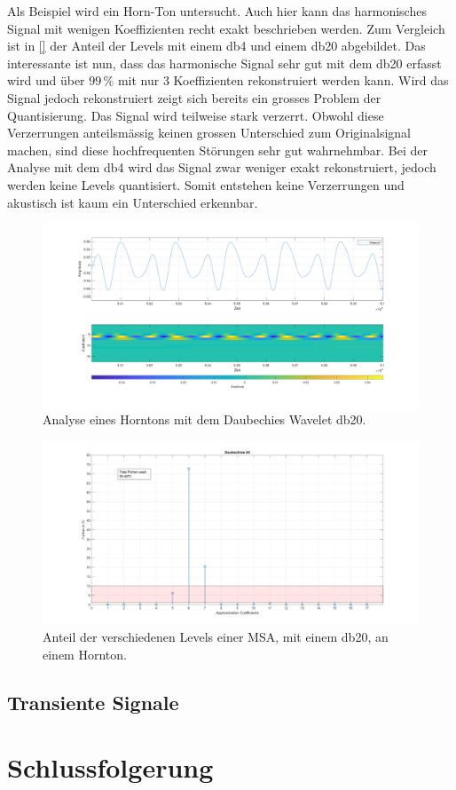 \begin{refsection}
Als Beispiel wird ein Horn-Ton untersucht.
Auch hier kann das harmonisches Signal mit wenigen Koeffizienten recht exakt beschrieben werden. 
Zum Vergleich ist in \autoref{} der Anteil der Levels mit einem db4 und einem db20 abgebildet.
Das interessante ist nun, dass das harmonische Signal sehr gut mit dem db20 erfasst wird und über $99\,\text{\%}$ mit nur 3 Koeffizienten rekonstruiert werden kann.
Wird das Signal jedoch rekonstruiert zeigt sich bereits ein grosses Problem der Quantisierung. 
Das Signal wird teilweise stark verzerrt.
Obwohl diese Verzerrungen anteilsmässig keinen grossen Unterschied zum Originalsignal machen, sind diese hochfrequenten Störungen sehr gut wahrnehmbar.
Bei der Analyse mit dem db4 wird das Signal zwar weniger exakt rekonstruiert, jedoch werden keine Levels quantisiert.
Somit entstehen keine Verzerrungen und akustisch ist kaum ein Unterschied erkennbar.


\begin{figure}
	\centering
	\includegraphics[width=\linewidth]{papers/compress/Bilder/frenchHorn_normal.pdf}
	\caption{Analyse eines Horntons mit dem Daubechies Wavelet db20.}
	\label{fig:horn}
\end{figure}
\begin{figure}
	\centering
	\includegraphics[width=\linewidth]{papers/compress/Bilder/frenchHorn_db20.pdf}
	\caption{Anteil der verschiedenen Levels einer MSA, mit einem db20, an einem Hornton.}
	\label{fig:db20horn}
\end{figure}
\subsection{Transiente Signale}

\section{Schlussfolgerung}

\printbibliography[heading=subbibliography]
\end{refsection}
